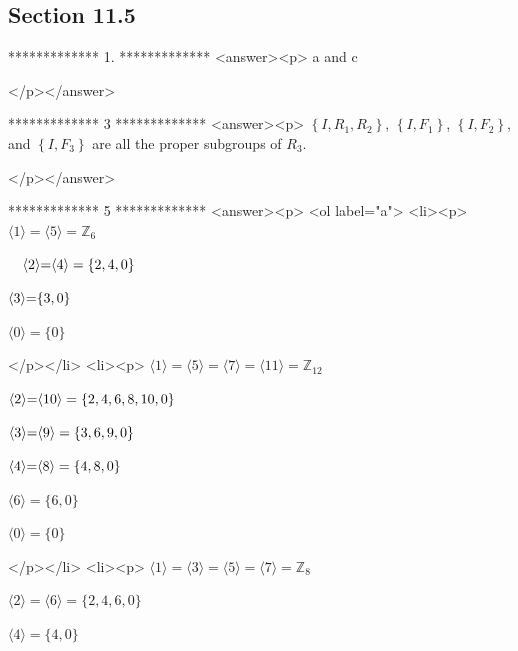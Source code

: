 \subsection{Section 11.5}

*************
1.
*************
<answer><p>   a and c

</p></answer>


*************
3
*************
<answer><p>   \(\left\{I,R_1,R_2\right\}\), \(\left\{I,F_1\right\}\), \(\left\{I,F_2\right\}\), and \(\left\{I,F_3\right\}\) are all the proper subgroups
of \(R_3\).

</p></answer>


*************
5
*************
<answer><p>  <ol label="a">
<li><p> \(\langle 1\rangle  = \langle 5\rangle  = \mathbb{Z}_6\)



\(\quad\)\(\langle 2\rangle \text = \langle 4\rangle  = \{2, 4, 0\}\)



\(\langle 3\rangle \text = \{3, 0\}\)



\(\langle 0\rangle  = \{0\}\)



     </p></li>
<li><p> \(\langle 1\rangle  = \langle 5\rangle  = \langle 7\rangle  = \langle 11\rangle  =\mathbb{Z}_{12}\)



\(\langle 2\rangle \text = \langle 10\rangle  = \{2, 4, 6, 8, 10, 0\}\)



\(\langle 3\rangle \text = \langle 9\rangle  = \{3, 6, 9, 0\}\)



\(\langle 4\rangle \text = \langle  8 \rangle  = \{ 4 , 8, 0\}\)



\(\langle 6\rangle  = \{6, 0\}\) 



\(\langle 0\rangle  = \{0\}\)



   </p></li>
<li><p>   \(\langle 1\rangle  = \langle  3\rangle  = \langle  5 \rangle  = \langle 7\rangle  = \mathbb{Z}_8\)



\(\langle 2\rangle  = \langle 6\rangle  = \{2, 4, 6, 0\}\) 



\(\langle 4\rangle  = \{4, 0\}\)



